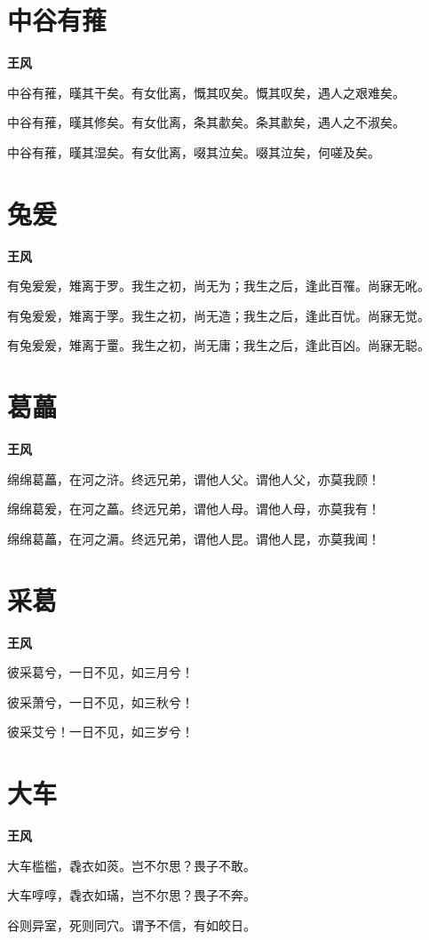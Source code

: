 \documentclass[12pt,a4paper]{ctexbook}
\begin{document}
\section{中谷有蓷}
\textbf{王风}\par\vspace{0.5em}
中谷有蓷，暵其干矣。有女仳离，慨其叹矣。慨其叹矣，遇人之艰难矣。\par
中谷有蓷，暵其修矣。有女仳离，条其歗矣。条其歗矣，遇人之不淑矣。\par
中谷有蓷，暵其湿矣。有女仳离，啜其泣矣。啜其泣矣，何嗟及矣。\par

\section{兔爰}
\textbf{王风}\par\vspace{0.5em}
有兔爰爰，雉离于罗。我生之初，尚无为；我生之后，逢此百罹。尚寐无吪。\par
有兔爰爰，雉离于罦。我生之初，尚无造；我生之后，逢此百忧。尚寐无觉。\par
有兔爰爰，雉离于罿。我生之初，尚无庸；我生之后，逢此百凶。尚寐无聪。\par

\section{葛藟}
\textbf{王风}\par\vspace{0.5em}
绵绵葛藟，在河之浒。终远兄弟，谓他人父。谓他人父，亦莫我顾！\par
绵绵葛爰，在河之藟。终远兄弟，谓他人母。谓他人母，亦莫我有！\par
绵绵葛藟，在河之漘。终远兄弟，谓他人昆。谓他人昆，亦莫我闻！\par

\section{采葛}
\textbf{王风}\par\vspace{0.5em}
彼采葛兮，一日不见，如三月兮！\par
彼采萧兮，一日不见，如三秋兮！\par
彼采艾兮！一日不见，如三岁兮！\par

\section{大车}
\textbf{王风}\par\vspace{0.5em}
大车槛槛，毳衣如菼。岂不尔思？畏子不敢。\par
大车啍啍，毳衣如璊，岂不尔思？畏子不奔。\par
谷则异室，死则同穴。谓予不信，有如皎日。\par
\end{document}
